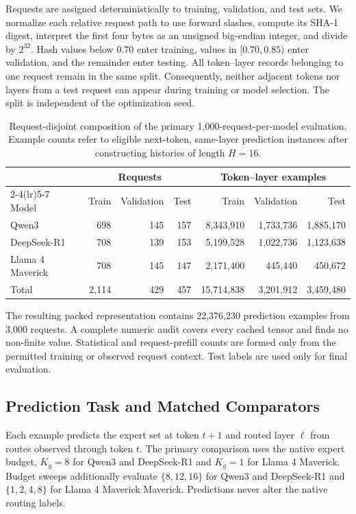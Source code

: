 \documentclass[conference]{IEEEtran}
\begin{document}
Requests are assigned deterministically to training, validation, and test
sets. We normalize each relative request path to use forward slashes, compute
its SHA-1 digest, interpret the first four bytes as an unsigned big-endian
integer, and divide by \(2^{32}\). Hash values below 0.70 enter training,
values in \([0.70,0.85)\) enter validation, and the remainder enter testing.
All token--layer records belonging to one request remain in the same split.
Consequently, neither adjacent tokens nor layers from a test request can
appear during training or model selection. The split is independent of the
optimization seed.

\begin{table}[!t]
\centering
\caption{Request-disjoint composition of the primary 1,000-request-per-model
evaluation. Example counts refer to eligible next-token, same-layer prediction
instances after constructing histories of length \(H=16\).}
\label{tab:data-splits}
\scriptsize
\setlength{\tabcolsep}{4.2pt}
\begin{tabular}{@{}lrrrrrr@{}}
\toprule
& \multicolumn{3}{c}{Requests} & \multicolumn{3}{c}{Token--layer examples} \\
\cmidrule(lr){2-4}\cmidrule(lr){5-7}
Model & Train & Validation & Test & Train & Validation & Test \\
\midrule
Qwen3 & 698 & 145 & 157 & 8,343,910 & 1,733,736 & 1,885,170 \\
DeepSeek-R1 & 708 & 139 & 153 & 5,199,528 & 1,022,736 & 1,123,638 \\
Llama 4 Maverick & 708 & 145 & 147 & 2,171,400 & 445,440 & 450,672 \\
\midrule
Total & 2,114 & 429 & 457 & 15,714,838 & 3,201,912 & 3,459,480 \\
\bottomrule
\end{tabular}
\end{table}

The resulting packed representation contains 22,376,230 prediction examples
from 3,000 requests. A complete numeric audit covers every cached tensor and
finds no non-finite value. Statistical and request-prefill counts are formed
only from the permitted training or observed request context. Test labels are
used only for final evaluation.

\subsection{Prediction Task and Matched Comparators}

Each example predicts the expert set at token \(t+1\) and routed layer
\(\ell\) from routes observed through token \(t\). The primary comparison uses
the native expert budget, \(K_g=8\) for Qwen3 and DeepSeek-R1 and \(K_g=1\)
for Llama 4 Maverick. Budget sweeps additionally evaluate
\(\{8,12,16\}\) for Qwen3 and DeepSeek-R1 and \(\{1,2,4,8\}\) for Llama 4 Maverick
Maverick. Predictions never alter the native routing labels.
\end{document}

